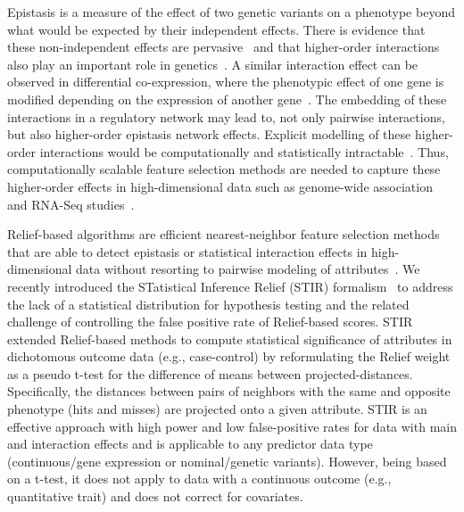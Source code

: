 \documentclass[10pt]{article}
\begin{document}
Epistasis is a measure of the effect of two genetic variants on a phenotype beyond what would be expected by their independent effects.
There is evidence that these non-independent effects are pervasive~\cite{breen12} and that higher-order interactions also play an important role in genetics~\cite{weinreich13}.
A similar interaction effect can be observed in differential co-expression, where the phenotypic effect of one gene is modified depending on the expression of another gene~\cite{lareau15,diffcoexp10}.
The embedding of these interactions in a regulatory network may lead to, not only pairwise interactions, but also higher-order epistasis network effects.
Explicit modelling of these higher-order interactions would be computationally and statistically intractable~\cite{riesselman18}.
Thus, computationally scalable feature selection methods are needed to capture these higher-order effects in high-dimensional data such as genome-wide association~\cite{titv} and RNA-Seq studies~\cite{stir}.

Relief-based algorithms are efficient nearest-neighbor feature selection methods that are able to detect epistasis or statistical interaction effects in high-dimensional data without resorting to pairwise modeling of attributes~\cite{urbanowicz17b, kononenko97, mckinney09, robnik2003theoretical}.
We recently introduced the STatistical Inference Relief (STIR) formalism~\cite{stir} to address the lack of a statistical distribution for hypothesis testing and the related challenge of controlling the false positive rate of Relief-based scores.
STIR extended Relief-based methods to compute statistical significance of attributes in dichotomous outcome data (e.g., case-control) by reformulating the Relief weight~\cite{mckinney13} as a pseudo t-test for the difference of means between projected-distances.
Specifically, the distances between pairs of neighbors with the same and opposite phenotype (hits and misses) are projected onto a given attribute.
STIR is an effective approach with high power and low false-positive rates for data with main and interaction effects and is applicable to any predictor data type (continuous/gene expression or nominal/genetic variants).
However, being based on a t-test, it does not apply to data with a continuous outcome (e.g., quantitative trait) and does not correct for covariates.
\end{document}
